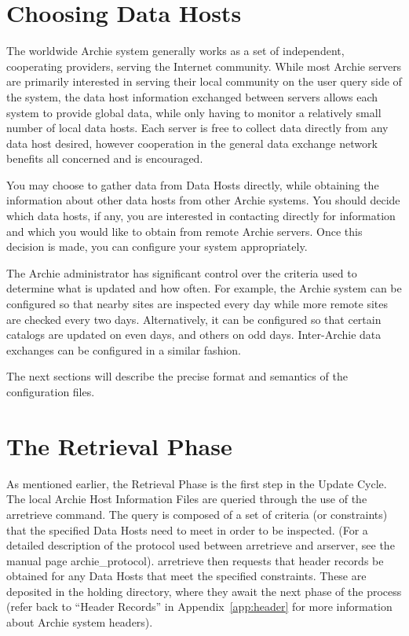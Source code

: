 %
%
%
\section{Choosing Data Hosts}

The worldwide Archie system generally works as a set of independent,
cooperating providers, serving the Internet community. While most Archie
servers are primarily interested in serving their local community on the user
query side of the system, the data host information exchanged between servers
allows each system to provide global data, while only having to monitor a
relatively small number of local data hosts. Each server is free to collect
data directly from any data host desired, however cooperation in the general
data exchange network benefits all concerned and is encouraged.

You may choose to gather data from Data Hosts directly, while obtaining the information about other data hosts from other Archie systems. You should decide which data hosts, if any, you are interested in contacting directly for information and which you would like to obtain from remote Archie servers. Once this decision is made, you can configure your system appropriately.






The Archie administrator has significant control over the criteria used to determine what is updated and how often. For example, the Archie system can be configured so that nearby sites are inspected every day while more remote sites are checked every two days. Alternatively, it can be configured so that certain catalogs are updated on even days, and others on odd days. Inter-Archie data exchanges can be configured in a similar fashion.

The next sections will describe the precise format and semantics of the configuration files.


%
%
%
\section{The Retrieval Phase}

As mentioned earlier, the Retrieval Phase is the first step in the Update
Cycle. The local Archie Host Information Files are queried through the use of
the arretrieve command. The query is composed of a set of criteria (or
constraints) that the specified Data Hosts need to meet in order to be
inspected. (For a detailed description of the protocol used between arretrieve
and arserver, see the manual page archie\_protocol). arretrieve then requests
that header records be obtained for any Data Hosts that meet the specified
constraints. These are deposited in the holding directory, where they await
the next phase of the process (refer back to ``Header Records'' in
Appendix~\ref{app:header} for more information about Archie system headers).



